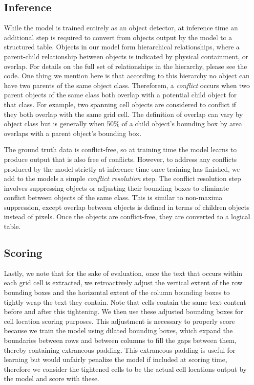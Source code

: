 \documentclass[10pt,twocolumn,letterpaper]{article}
\begin{document}
\subsection{Inference}

While the model is trained entirely as an object detector, at inference time an additional step is required to convert from objects output by the model to a structured table.
Objects in our model form hierarchical relationships, where a parent-child relationship between objects is indicated by physical containment, or overlap.
For details on the full set of relationships in the hierarchy, please see the code.
One thing we mention here is that according to this hierarchy no object can have two parents of the same object class.
Thereforem, a \emph{conflict} occurs when two parent objects of the same class both overlap with a potential child object for that class.
For example, two spanning cell objects are considered to conflict if they both overlap with the same grid cell.
The definition of overlap can vary by object class but is generally when 50\% of a child object's bounding box by area overlaps with a parent object's bounding box.

The ground truth data is conflict-free, so at training time the model learns to produce output that is also free of conflicts.
However, to address any conflicts produced by the model strictly at inference time once training has finished, we add to the models a simple \textit{conflict resolution} step.
The conflict resolution step involves suppressing objects or adjusting their bounding boxes to eliminate conflict between objects of the same class.
This is similar to non-maxima suppression, except overlap between objects is defined in terms of children objects instead of pixels.
Once the objects are conflict-free, they are converted to a logical table.

\subsection{Scoring}

Lastly, we note that for the sake of evaluation, once the text that occurs within each grid cell is extracted, we retroactively adjust the vertical extent of the row bounding boxes and the horizontal extent of the column bounding boxes to tightly wrap the text they contain.
Note that cells contain the same text content before and after this tightening.
We then use these adjusted bounding boxes for cell location scoring purposes.
This adjustment is necessary to properly score because we train the model using dilated bounding boxes, which expand the boundaries between rows and between columns to fill the gaps between them, thereby containing extraneous padding.
This extraneous padding is useful for learning but would unfairly penalize the model if included at scoring time, therefore we consider the tightened cells to be the actual cell locations output by the model and score with these.
\end{document}
